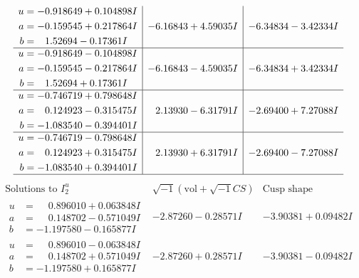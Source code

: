 \documentclass[1p]{elsarticle_modified}
\theoremstyle{definition}
\newcommand{\I}{\sqrt{-1}}
\begin{document}
$$\begin{array}{c|c|c}
\begin{aligned}
u &= -0.918649 + 0.104898 I \\
a &= -0.159545 + 0.217864 I \\
b &= \phantom{-}1.52694 - 0.17361 I\end{aligned}
 & -6.16843 + 4.59035 I & -6.34834 - 3.42334 I \\ \hline\begin{aligned}
u &= -0.918649 - 0.104898 I \\
a &= -0.159545 - 0.217864 I \\
b &= \phantom{-}1.52694 + 0.17361 I\end{aligned}
 & -6.16843 - 4.59035 I & -6.34834 + 3.42334 I \\ \hline\begin{aligned}
u &= -0.746719 + 0.798648 I \\
a &= \phantom{-}0.124923 - 0.315475 I \\
b &= -1.083540 - 0.394401 I\end{aligned}
 & \phantom{-}2.13930 - 6.31791 I & -2.69400 + 7.27088 I \\ \hline\begin{aligned}
u &= -0.746719 - 0.798648 I \\
a &= \phantom{-}0.124923 + 0.315475 I \\
b &= -1.083540 + 0.394401 I\end{aligned}
 & \phantom{-}2.13930 + 6.31791 I & -2.69400 - 7.27088 I\\
 \hline 
 \end{array}$$\newpage$$\begin{array}{c|c|c}  
\text{Solutions to }I^u_{2}& \I (\text{vol} + \sqrt{-1}CS) & \text{Cusp shape}\\
 \hline 
\begin{aligned}
u &= \phantom{-}0.896010 + 0.063848 I \\
a &= \phantom{-}0.148702 - 0.571049 I \\
b &= -1.197580 - 0.165877 I\end{aligned}
 & -2.87260 - 0.28571 I & -3.90381 + 0.09482 I \\ \hline\begin{aligned}
u &= \phantom{-}0.896010 - 0.063848 I \\
a &= \phantom{-}0.148702 + 0.571049 I \\
b &= -1.197580 + 0.165877 I\end{aligned}
 & -2.87260 + 0.28571 I & -3.90381 - 0.09482 I \\ \hline\begin{aligned}

\end{aligned}
\end{array}$$
\end{document}
